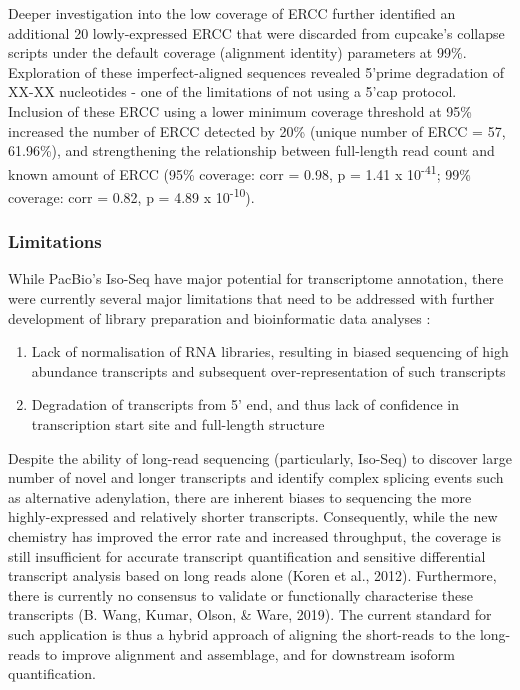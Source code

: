 Deeper investigation into the low coverage of ERCC further identified an additional 20 lowly-expressed ERCC that were discarded from cupcake's collapse scripts under the default coverage (alignment identity) parameters at 99\%. Exploration of these imperfect-aligned sequences revealed 5'prime degradation of XX-XX nucleotides - one of the limitations of not using a 5'cap protocol. Inclusion of these ERCC using a lower minimum coverage threshold at 95\% increased the number of ERCC detected by 20\% (unique number of ERCC = 57, 61.96\%), and strengthening the relationship between full-length read count and known amount of ERCC (95\% coverage: corr = 0.98, p = 1.41 x 10\textsuperscript{-41}; 99\% coverage: corr = 0.82, p = 4.89 x 10\textsuperscript{-10}).   


\subsubsection{Limitations}
While PacBio's Iso-Seq have major potential for transcriptome annotation, there were currently several major limitations that need to be addressed with further development of library preparation and bioinformatic data analyses \cite{Kuo2017}: 
\begin{enumerate}
	\item Lack of normalisation of RNA libraries, resulting in biased sequencing of high abundance transcripts and subsequent over-representation of such transcripts 
	\item Degradation of transcripts from 5' end, and thus lack of confidence in transcription start site and full-length structure 
\end{enumerate}

Despite the ability of long-read sequencing (particularly, Iso-Seq) to discover large number of novel and longer transcripts and identify complex splicing events such as alternative adenylation, there are inherent biases to sequencing the more highly-expressed and relatively shorter transcripts. Consequently, while the new chemistry has improved the error rate and increased throughput, the coverage is still insufficient for accurate transcript quantification and sensitive differential transcript analysis based on long reads alone (Koren et al., 2012). Furthermore, there is currently no consensus to validate or functionally characterise these transcripts (B. Wang, Kumar, Olson, \& Ware, 2019). The current standard for such application is thus a hybrid approach of aligning the short-reads to the long-reads to improve alignment and assemblage, and for downstream isoform quantification. 

